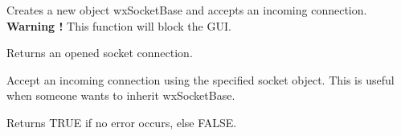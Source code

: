 %
%


Creates a new object wxSocketBase and accepts an incoming connection. {\bf Warning !} This function will block the GUI.


Returns an opened socket connection.



%
%
\label{wxsocketserveracceptwith}


Accept an incoming connection using the specified socket object.
This is useful when someone wants to inherit wxSocketBase.




Returns TRUE if no error occurs, else FALSE.


